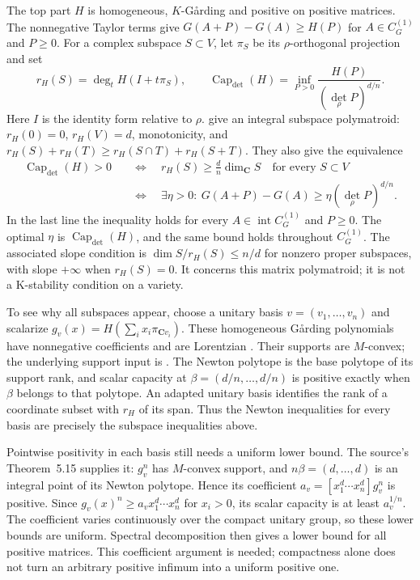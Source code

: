 The top part $H$ is homogeneous, $K$-G\aa rding and positive
on positive matrices. The nonnegative Taylor terms give
$G(A+P)-G(A)\geq H(P)$ for $A\in C_G^{(1)}$ and $P\geq0$.
For a complex subspace $S\subset V$, let $\pi_S$ be its
$\rho$-orthogonal projection and set
\[
\tag{68.23ck}\label{eq:ytd-subspace-rank-capacity}
 r_H(S)=\deg_t H(I+t\pi_S),\qquad
 \operatorname{Cap}_{\det}(H)
   =\inf_{P>0}\frac{H(P)}{(\det_\rho P)^{d/n}}.
\]
Here $I$ is the identity form relative to $\rho$.
\cite[Theorems~5.12 and~5.17]{FangMaWu26DeterminantalV1}
give an integral subspace polymatroid:
$r_H(0)=0$, $r_H(V)=d$, monotonicity, and
$r_H(S)+r_H(T)\geq r_H(S\cap T)+r_H(S+T)$.
They also give the equivalence
\[
\tag{68.23cl}\label{eq:ytd-determinantal-slope-criterion}
\begin{aligned}
 \operatorname{Cap}_{\det}(H)>0
 &\quad\Longleftrightarrow\quad
 r_H(S)\geq\frac dn\dim_{\mathbf C}S
       \quad\text{for every }S\subset V\\
 &\quad\Longleftrightarrow\quad
 \exists\eta>0:\ G(A+P)-G(A)
       \geq\eta(\det_\rho P)^{d/n}.
\end{aligned}
\]
In the last line the inequality holds for every
$A\in\operatorname{int}C_G^{(1)}$ and $P\geq0$.
The optimal $\eta$ is $\operatorname{Cap}_{\det}(H)$, and the
same bound holds throughout $C_G^{(1)}$.
The associated slope condition is
$\dim S/r_H(S)\leq n/d$ for nonzero proper subspaces, with
slope $+\infty$ when $r_H(S)=0$. It concerns this matrix
polymatroid; it is not a K-stability condition on a variety.

To see why all subspaces appear, choose a unitary basis
$v=(v_1,\ldots,v_n)$ and scalarize
$g_v(x)=H(\sum_i x_i\pi_{\mathbf C v_i})$.
These homogeneous G\aa rding polynomials have nonnegative
coefficients and are Lorentzian
\cite[Theorem~11.2]{FangMa26GardingV3}.
Their supports are $M$-convex; the underlying support input is
\cite[Theorem~2.23]{BrandenHuh20Lorentzian}.
The Newton polytope is the base polytope of its support rank,
and scalar capacity at $\beta=(d/n,\ldots,d/n)$ is positive
exactly when $\beta$ belongs to that polytope. An adapted
unitary basis identifies the rank of a coordinate subset with
$r_H$ of its span. Thus the Newton inequalities for every basis
are precisely the subspace inequalities above.

Pointwise positivity in each basis still needs a uniform lower
bound. The source's Theorem~5.15 supplies it: $g_v^n$ has
$M$-convex support, and $n\beta=(d,\ldots,d)$ is an integral
point of its Newton polytope. Hence its coefficient
$a_v=[x_1^d\cdots x_n^d]g_v^n$ is positive. Since
$g_v(x)^n\geq a_v x_1^d\cdots x_n^d$ for $x_i>0$,
its scalar capacity is at least $a_v^{1/n}$.
The coefficient varies continuously over the compact unitary
group, so these lower bounds are uniform. Spectral decomposition
then gives a lower bound for all positive matrices.
This coefficient argument is needed; compactness alone does not
turn an arbitrary positive infimum into a uniform positive one.

